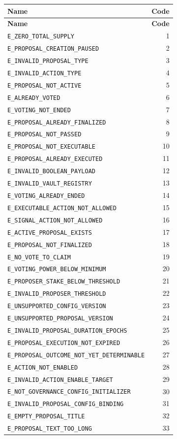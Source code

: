 \documentclass[11pt]{article}
\newcommand{\code}[1]{\texttt{#1}}
\begin{document}
\begin{longtable}{lr}
\toprule
\textbf{Name} & \textbf{Code} \\
\midrule
\endfirsthead
\toprule
\textbf{Name} & \textbf{Code} \\
\midrule
\endhead
\code{E\_ZERO\_TOTAL\_SUPPLY} & 1 \\
\code{E\_PROPOSAL\_CREATION\_PAUSED} & 2 \\
\code{E\_INVALID\_PROPOSAL\_TYPE} & 3 \\
\code{E\_INVALID\_ACTION\_TYPE} & 4 \\
\code{E\_PROPOSAL\_NOT\_ACTIVE} & 5 \\
\code{E\_ALREADY\_VOTED} & 6 \\
\code{E\_VOTING\_NOT\_ENDED} & 7 \\
\code{E\_PROPOSAL\_ALREADY\_FINALIZED} & 8 \\
\code{E\_PROPOSAL\_NOT\_PASSED} & 9 \\
\code{E\_PROPOSAL\_NOT\_EXECUTABLE} & 10 \\
\code{E\_PROPOSAL\_ALREADY\_EXECUTED} & 11 \\
\code{E\_INVALID\_BOOLEAN\_PAYLOAD} & 12 \\
\code{E\_INVALID\_VAULT\_REGISTRY} & 13 \\
\code{E\_VOTING\_ALREADY\_ENDED} & 14 \\
\code{E\_EXECUTABLE\_ACTION\_NOT\_ALLOWED} & 15 \\
\code{E\_SIGNAL\_ACTION\_NOT\_ALLOWED} & 16 \\
\code{E\_ACTIVE\_PROPOSAL\_EXISTS} & 17 \\
\code{E\_PROPOSAL\_NOT\_FINALIZED} & 18 \\
\code{E\_NO\_VOTE\_TO\_CLAIM} & 19 \\
\code{E\_VOTING\_POWER\_BELOW\_MINIMUM} & 20 \\
\code{E\_PROPOSER\_STAKE\_BELOW\_THRESHOLD} & 21 \\
\code{E\_INVALID\_PROPOSER\_THRESHOLD} & 22 \\
\code{E\_UNSUPPORTED\_CONFIG\_VERSION} & 23 \\
\code{E\_UNSUPPORTED\_PROPOSAL\_VERSION} & 24 \\
\code{E\_INVALID\_PROPOSAL\_DURATION\_EPOCHS} & 25 \\
\code{E\_PROPOSAL\_EXECUTION\_NOT\_EXPIRED} & 26 \\
\code{E\_PROPOSAL\_OUTCOME\_NOT\_YET\_DETERMINABLE} & 27 \\
\code{E\_ACTION\_NOT\_ENABLED} & 28 \\
\code{E\_INVALID\_ACTION\_ENABLE\_TARGET} & 29 \\
\code{E\_NOT\_GOVERNANCE\_CONFIG\_INITIALIZER} & 30 \\
\code{E\_INVALID\_PROPOSAL\_CONFIG\_BINDING} & 31 \\
\code{E\_EMPTY\_PROPOSAL\_TITLE} & 32 \\
\code{E\_PROPOSAL\_TEXT\_TOO\_LONG} & 33 \\
\bottomrule
\end{longtable}
\end{document}

